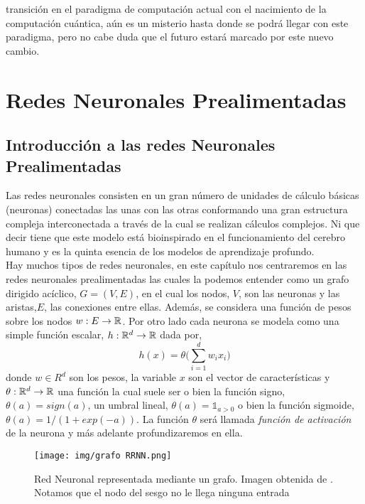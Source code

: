 {transición en el paradigma de computación actual con el nacimiento de la computación cuántica, aún es un misterio hasta donde se podrá llegar con este paradigma, pero no cabe duda que el futuro estará marcado por este nuevo cambio. 
   
	\par\bigskip
}
\chapter{Redes Neuronales Prealimentadas}\label{ch:MLP}

\newpage 
\section{Introducción a las redes Neuronales Prealimentadas}

    Las redes neuronales consisten en un gran número de unidades de cálculo básicas (neuronas) conectadas las unas con las otras conformando una gran estructura compleja interconectada a través de la cual se realizan cálculos complejos. Ni que decir tiene que este modelo está bioinspirado en el funcionamiento del cerebro humano y es la quinta esencia de los modelos de aprendizaje profundo. \\
    
    Hay muchos tipos de redes neuronales, en este capítulo nos centraremos en las redes neuronales prealimentadas las cuales la podemos entender como un grafo dirigido acíclico, $G = (V,E)$, en el cual los nodos, $V$, son las neuronas y las aristas,$E$, las conexiones entre ellas. Además, se considera una función de pesos sobre los nodos $w:E \to \mathbb{R}$. Por otro lado cada neurona se modela como una simple función escalar, $h:\mathbb{R}^d \to \mathbb{R}$ dada por,
    \begin{equation}
        h(x) = \theta \Big(\sum_{i=1}^d w_i x_i\Big)
    \end{equation}
    \noindent donde $w \in R^d$ son los pesos, la variable $x$ son el vector de características y $\theta:\mathbb{R}^d \to \mathbb{R}$ una función la cual suele ser o bien la función signo, $\theta(a) = sign(a)$, un umbral lineal, $\theta(a) = \mathbb{1}_{a>0}$ o bien la función sigmoide, $\theta(a) = 1/(1 + exp(-a))$. La función $\theta$ será llamada \textit{función de activación} de la neurona y más adelante profundizaremos en ella.  \\
    
    \begin{figure}[H]
        \centering
        \texttt{[image: img/grafo RRNN.png]}
        \caption{Red Neuronal representada mediante un grafo. Imagen obtenida de \cite{data}. Notamos que el nodo del sesgo no le llega ninguna entrada}
        \label{fig:grafo rrnn prealimentada}
    \end{figure}
    

